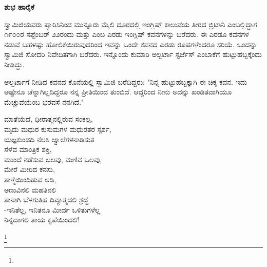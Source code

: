 \begin{flushright}
\end{flushright}

\begin{center}
\textbf{ಶುಭ ಹಾರೈಕೆ}
\end{center}

ಸ್ವಾಮಿಜಿಯವರು ಪ್ಯಾರಿಸಿನಿಂದ ಮುನ್ನೂರು ಮೈಲಿ ದೂರದಲ್ಲಿ ಇಂಗ್ಲಿಷ್ ಕಾಲುವೆಯ ತೀರದ ಬ್ರಿಟಾನಿ ಎಂಬಲ್ಲಿದ್ದಾಗ ೧೯೦೦ರ ಸಪ್ಟೆಂಬರ್ ೨೨ರಂದು  ಮತ್ತು  ಎಂಬ ಎರಡು ಇಂಗ್ಲಿಷ್ ಕವನಗಳನ್ನು ಬರೆದರು. ಈ ಎರಡೂ ಕವನಗಳ ನಡುವೆ ಬಹಳಷ್ಟು ಹೋಲಿಕೆಯಿರುವುದರಿಂದ ಇವನ್ನು ಒಂದೇ ಕವನದ ಎರಡು ರೂಪಗಳೆಂದರೂ ಸರಿಯೆ. ಒಂದನ್ನು ಸ್ವಾಮಿಜಿ ಸೋದರಿ ನಿವೇದಿತಗಾಗಿ ಬರೆದರು. ಇನ್ನೊಂದು ಕುಮಾರಿ ಅಲ್ಬರ್ಟಾ ಸ್ಟರ್ಜೆಸ್ ಎಂಬಾಕೆಗೆ ಹುಟ್ಟುಹಬ್ಬಕ್ಕೆಂದು ನೀಡಿದ್ದು.

ಆಲ್ಬರ್ಟಾಗೆ ನೀಡಿದ ಕವನದ ಕೊನೆಯಲ್ಲಿ ಸ್ವಾಮಿಜಿ ಬರೆದಿದ್ದರು: "ನಿನ್ನ ಹುಟ್ಟುಹಬ್ಬಕ್ಕಾಗಿ ಈ ಚಿಕ್ಕ ಕವನ. ಇದು ಅಷ್ಟೇನೂ ಚೆನ್ನಾಗಿಲ್ಲದಿದ್ದರೂ ನನ್ನ ಪ್ರೀತಿಯಿಂದ ತುಂಬಿದೆ. ಆದ್ದರಿಂದ ನೀನು ಅದನ್ನು ಖಂಡಿತವಾಗಿಯೂ ಮೆಚ್ಚುವೆಯೆಂಬ ಭರವಸೆ ನನಗಿದೆ."

\begin{myquote}
ಮಾತೆಯೆದೆ, ಧೀರಾತ್ಮನಲ್ಲಿರುವ ಸಂಕಲ್ಪ,\\ಮೃದು ಮಧುರ ಕುಸುಮಗಳ ಮಧುರತರ ಸ್ಪರ್ಶ,\\ಯಜ್ಞಕುಂಡದಿ ನೆಲಸಿ ಜ್ವಾಲೆಗಳನಾಡಿಸುತ\\ಸೆಳೆವ ಮಾಂತ್ರಿಕ ಶಕ್ತಿ,\\ಮುಂದೆ ನಡೆಸುವ ಬಲವು, ಮಣಿವ ಒಲವು,\\ಮೇರೆ ಮೀರಿದ ಕನಸು,\\ತಾಳ್ಮೆಯಿಂದಿಡುವ ಅಡಿ,\\ಅಣುವಿನಲಿ ಮಹತಿನಲಿ\\ತಾನಾಗಿ ಬೆಳಗುತಿಹ ದಿವ್ಯಾತ್ಮದಲಿ ಶ್ರದ್ಧೆ\\-ಇನಿತೆಲ್ಲ, ಇನಿತನೂ ಮೀರ್ದ ಒಳಿತುಗಳೆಲ್ಲ\\ನಿನ್ನದಾಗಲಿ ತಾಯ ಕೃಪೆಯಿಂದಲಿ!
\end{myquote}

\protect\footnote{}

\begin{myquote}
\end{myquote}


